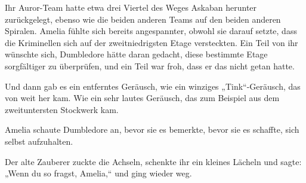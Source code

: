 \later

Ihr Auror-Team hatte etwa drei Viertel des Weges Askaban herunter zurückgelegt, ebenso wie die beiden anderen Teams auf den beiden anderen Spiralen. Amelia fühlte sich bereits angespannter, obwohl sie darauf setzte, dass die Kriminellen sich auf der zweitniedrigsten Etage versteckten. Ein Teil von ihr wünschte sich, Dumbledore hätte daran gedacht, diese bestimmte Etage sorgfältiger zu überprüfen, und ein Teil war froh, dass er das nicht getan hatte.

Und dann gab es ein entferntes Geräusch, wie ein winziges „Tink“-Geräusch, das von weit her kam. Wie ein sehr lautes Geräusch, das zum Beispiel aus dem zweituntersten Stockwerk kam.

Amelia schaute Dumbledore an, bevor sie es bemerkte, bevor sie es schaffte, sich selbst aufzuhalten.

Der alte Zauberer zuckte die Achseln, schenkte ihr ein kleines Lächeln und sagte: „Wenn du so fragst, Amelia,“ und ging wieder weg.

\later

